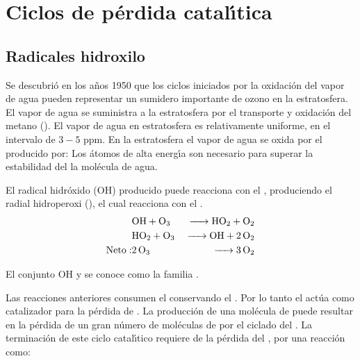 \section[Ciclos de perdida catalitica]{Ciclos de p\'erdida catal\'{\i}tica}
\label{cpeoz}

\subsection{Radicales hidroxilo}
\label{roh}

Se descubri\'o en los a\~nos 1950 que los ciclos iniciados por la oxidaci\'on del vapor de agua pueden representar un sumidero importante de ozono en la estratosfera. El vapor de agua se suministra a la estratosfera por el transporte y oxidaci\'on del metano (). El vapor de agua en estratosfera es relativamente uniforme, en el intervalo de $3-5$ ppm. En la estratosfera el vapor de agua se oxida por el  producido por:
Los \'atomos de alta energ\'{\i}a  son necesario para superar la estabilidad del la mol\'ecula de agua.

El radical hidr\'oxido (OH)  producido puede reacciona con el , produciendo el radial hidroperoxi (), el cual reacciona con el .
\begin{eqnarray*}
& \ce{OH + O3    & -> HO2 + O2 \\
      & HO2 +  O3   &-> OH + 2O2} \\
\mathrm{Neto: } &  \ce{2O3   &  ->  3O2}
\end{eqnarray*}

El conjunto OH y  se conoce como la familia .

Las reacciones anteriores consumen el  conservando el . Por lo tanto el  act\'ua como catalizador para la p\'erdida de . La producci\'on de una mol\'ecula de  puede resultar en la p\'erdida de un gran n\'umero de mol\'eculas de  por el ciclado del . La terminaci\'on de este ciclo catal\'{\i}tico requiere de la p\'erdida del , por una reacci\'on como:

